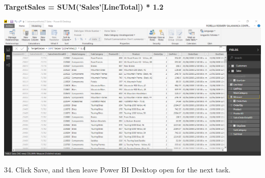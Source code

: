 \textbf{TargetSales = SUM('Sales'[LineTotal]) * 1.2}

	\begin{center}
	\includegraphics[width=17cm]{./Imagenes/Ejercicio1/Tarea3/29}
	\end{center}	

34. Click Save, and then leave Power BI Desktop open for the next task.
